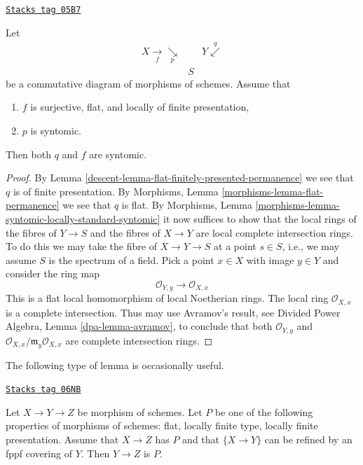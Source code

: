 \begin{lemma}
\label{descent-lemma-syntomic-permanence}
\href{https://stacks.math.columbia.edu/tag/05B7}{\texttt{Stacks tag 05B7}}

Let
$$
\begin{array}{ccc}X \underset{f}{\longrightarrow}\underset{p}{\searrow} &  & Y \overset{q}{\swarrow} \\  & S & \end{array}
$$
be a commutative diagram of morphisms of schemes. Assume that
\begin{enumerate}
\item $f$ is surjective, flat, and locally of finite presentation,
\item $p$ is syntomic.
\end{enumerate}
Then both $q$ and $f$ are syntomic.
\end{lemma}

\begin{proof}

By Lemma \ref{descent-lemma-flat-finitely-presented-permanence} we see that $q$
is of finite presentation. By
Morphisms, Lemma \ref{morphisms-lemma-flat-permanence}
we see that $q$ is flat.
By Morphisms, Lemma \ref{morphisms-lemma-syntomic-locally-standard-syntomic}
it now suffices to show that the local rings of the fibres of
$Y \to S$ and the fibres of $X \to Y$ are local complete intersection
rings. To do this we may take the fibre of $X \to Y \to S$ at
a point $s \in S$, i.e., we may assume $S$ is the spectrum of a
field. Pick a point $x \in X$ with image $y \in Y$ and
consider the ring map
$$
\mathcal{O}_{Y, y} \longrightarrow \mathcal{O}_{X, x}
$$
This is a flat local homomorphism of local Noetherian rings.
The local ring $\mathcal{O}_{X, x}$ is a complete intersection.
Thus may use Avramov's result, see
Divided Power Algebra, Lemma \ref{dpa-lemma-avramov},
to conclude that both $\mathcal{O}_{Y, y}$ and
$\mathcal{O}_{X, x}/\mathfrak m_y\mathcal{O}_{X, x}$ are
complete intersection rings.
\end{proof}

The following type of lemma is occasionally useful.

\begin{lemma}[Curiosity]
\label{descent-lemma-curiosity}
\href{https://stacks.math.columbia.edu/tag/06NB}{\texttt{Stacks tag 06NB}}

Let $X \to Y \to Z$ be morphism of schemes.
Let $P$ be one of the following properties of morphisms of schemes:
flat, locally finite type, locally finite presentation.
Assume that $X \to Z$ has $P$ and that $\{X \to Y\}$
can be refined by an fppf covering of $Y$. Then $Y \to Z$ is $P$.
\end{lemma}


